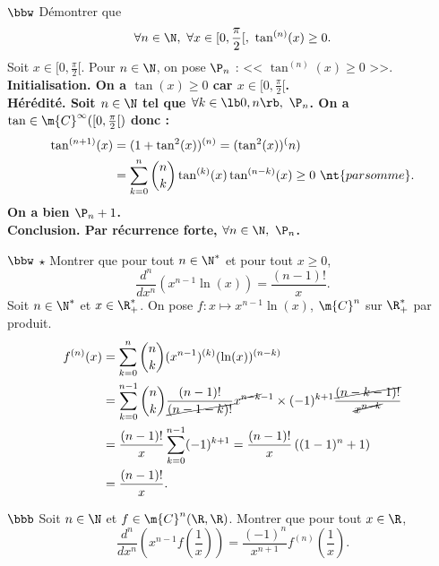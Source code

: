 \documentclass[11pt]{article}
\begin{document}
\pagebreak

\begin{exercice}{$\bbw$}{}
    Démontrer que
    \begin{equation*}
        \forall n \in \N, ~ \forall x \in [0,\frac{\pi}{2}[, ~ \tan^{(n)}(x) \geq 0.
    \end{equation*}
    \tcblower
    Soit $x\in[0,\frac{\pi}{2}[$. Pour $n\in\N$, on pose $\P_n$ : << $\tan^{(n)}(x)\geq 0$ >>.\\
    \bf{Initialisation.} On a $\tan(x)\geq0$ car $x\in[0,\frac{\pi}{2}[$.\\
    \bf{Hérédité.} Soit $n\in\N$ tel que $\forall k \in \lb0,n\rb, ~ \P_n$. On a $\tan\in\m{C}^{\infty}([0,\frac{\pi}{2}[)$ donc :
    \begin{align*}
        \tan^{(n+1)}(x) &= (1+\tan^2(x))^{(n)} = (\tan^2(x))^(n)\\
        &=\sum_{k=0}^n\binom{n}{k}\tan^{(k)}(x)\tan^{(n-k)}(x)\geq0 ~ \nt{par somme}.
    \end{align*} 
    On a bien $\P_n+1$.\\
    \bf{Conclusion.} Par récurrence forte, $\forall n \in \N, ~ \P_n$.
\end{exercice}

\begin{exercice}{$\bbw$ $\star$}{}
    Montrer que pour tout $n\in\N^*$ et pour tout $x\geq0$,
    \begin{equation*}
        \frac{d^n}{dx^n}\left( x^{n-1}\ln(x) \right)=\frac{(n-1)!}{x}.
    \end{equation*}
    \tcblower
    Soit $n\in\N^*$ et $x\in\R^*_+$. On pose $f:x\mapsto x^{n-1}\ln(x)$, $\m{C}^n$ sur $\R_+^*$ par produit.
    \begin{align*}
        f^{(n)}(x) &= \sum_{k=0}^n\binom{n}{k}(x^{n-1})^{(k)}(\ln(x))^{(n-k)}\\
        &=\sum_{k=0}^{n-1}\binom{n}{k}\frac{(n-1)!}{\cancel{(n-1-k)!}}x^{\cancel{n-k}-1}\times(-1)^{k+1}\frac{\cancel{(n-k-1)!}}{\cancel{x^{n-k}}}\\
        &=\frac{(n-1)!}{x}\sum_{k=0}^{n-1}(-1)^{k+1}=\frac{(n-1)!}{x}\left( (1-1)^n + 1 \right)\\
        &=\frac{(n-1)!}{x}.
    \end{align*}
\end{exercice}

\begin{exercice}{$\bbb$}{}
    Soit $n\in\N$ et $f\in\m{C}^n(\R,\R)$. Montrer que pour tout $x\in\R$,
    \begin{equation*}
        \frac{d^n}{dx^n}\left( x^{n-1}f\left( \frac{1}{x} \right) \right)=\frac{(-1)^n}{x^{n+1}}f^{(n)}\left( \frac{1}{x} \right).
    \end{equation*}
\end{exercice}
\end{document}

